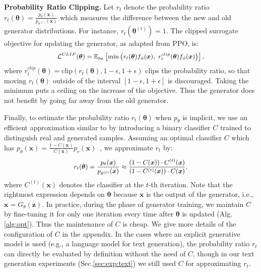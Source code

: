 \documentclass{article}
\newcommand{\0}{\bm{0}}
\newcommand{\E}{\mathbb{E}}
\newcommand{\x}{\bm{x}}
\begin{document}
\textbf{Probability Ratio Clipping.}  
Let $r_t$ denote the probability ratio $r_t(\bm{\theta})=\frac{p_\theta(\x)}{p_{\theta^{(t)}}(\x)}$ which measures the difference between the new and old generator distributions.
For instance, $r_t(\bm{\theta}^{(t)}) = 1$. 
The clipped surrogate objective for updating the generator, as adapted from PPO, is:
\begin{equation}
\small
\begin{split}
\mathcal{L}^{CLIP}(\bm{\theta}) = \E_{p_\theta}\left[ \min\left( r_t(\bm{\theta}) f_\phi(\x),~ r_t^{clip}(\bm{\theta}) f_\phi(\x) \right) \right],
\end{split}
\label{eq:obj-clip}
\end{equation}
where $r_t^{clip}(\bm{\theta}) = \text{clip}\left(r_t(\bm{\theta}), 1-\epsilon, 1+\epsilon\right)$ clips the probability ratio, so that moving $r_t(\bm{\theta})$ outside of the interval $[1-\epsilon, 1+\epsilon]$ is discouraged. Taking the minimum puts a ceiling on the increase of the objective. Thus the generator does not benefit by going far away from the old generator.

Finally, to estimate the probability ratio $r_t(\bm{\theta})$ when $p_\theta$ is implicit, we use an efficient approximation similar to \cite{MLGAN,grover2019bias} by introducing a binary classifier $C$ trained to distinguish real and generated samples. Assuming an optimal classifier $C$ which has $p_\theta(\x) = \frac{1-C(\x)}{C(\x)}p_r(\x)$~\cite{goodfellow2014generative,MLGAN}, we approximate $r_t$ by: 
\begin{equation}
\small
\begin{split}
r_t(\bm{\theta}) = \frac{p_\theta(\x)}{p_{\theta^{(t)}}(\x)} \approx \frac{(1-C(\x))\cdot C^{(t)}(\x)}{(1-C^{(t)}(\x))\cdot C(\x)},
\end{split}
\label{eq:r-approx}
\end{equation}
where $C^{(t)}(\x)$ denotes the classifier at the $t$-th iteration. 
Note that the rightmost expression depends on $\bm{\theta}$ because $\x$ is the output of the generator, i.e., $\x=G_\theta(\bm{z})$.
In practice, during the phase of generator training, we maintain $C$ by fine-tuning it for only one iteration every time after $\bm{\theta}$ is updated (Alg.\ref{alg:opt}). Thus the maintenance of $C$ is cheap. We give more details of the configuration of $C$ in the appendix. In the cases where an explicit generative model is used (e.g., a language model for text generation), the probability ratio $r_t$ can directly be evaluated by definition without the need of $C$, though in our text generation experiments (Sec.\ref{sec:exp:text}) we still used $C$ for approximating $r_t$.
\end{document}

